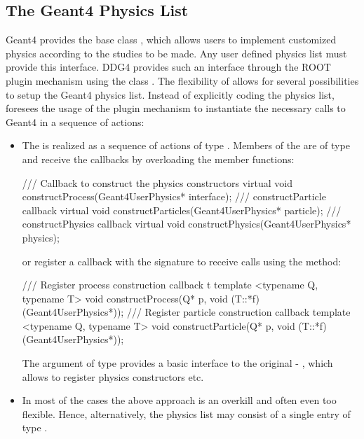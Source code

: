 \newpage

\subsection{The Geant4 Physics List}
\label{sec:ddg4-implementation-physics-list}
\noindent 
Geant4 provides the base class , which allows users
to implement customized physics according to the studies to be made.
Any user defined physics list must provide this interface. DDG4 provides such an interface
through the ROOT plugin mechanism using the class .
The flexibility of \DDG allows for several possibilities to setup the Geant4
physics list. Instead of explicitly coding the physics list, \DDG foresees the
usage of the plugin mechanism to instantiate the necessary calls to Geant4 in a
sequence of actions:
\begin{itemize}
\item The  is realized as a sequence of actions of type 
    {}.
    Members of the 
    {} are of type
    {} and receive the callbacks by overloading 
    the member functions:
\begin{unnumberedcode}
  /// Callback to construct the physics constructors
  virtual void constructProcess(Geant4UserPhysics* interface);
  /// constructParticle callback
  virtual void constructParticles(Geant4UserPhysics* particle);
  /// constructPhysics callback
  virtual void constructPhysics(Geant4UserPhysics* physics);
\end{unnumberedcode}
    or register a callback with the signature {}
    to receive calls using the method:
\begin{unnumberedcode}
  /// Register process construction callback t
  template <typename Q, typename T> void constructProcess(Q* p, void (T::*f)(Geant4UserPhysics*));
  /// Register particle construction callback
  template <typename Q, typename T> void constructParticle(Q* p, void (T::*f)(Geant4UserPhysics*));
\end{unnumberedcode}
    The argument of type 
    {} provides a basic interface to the original
    - , which allows to register physics constructors etc.

\item In most of the cases the above approach is an overkill and often even too flexible.
    Hence, alternatively, the physics list may consist of a single entry of type 
    {}.
\end{itemize}

